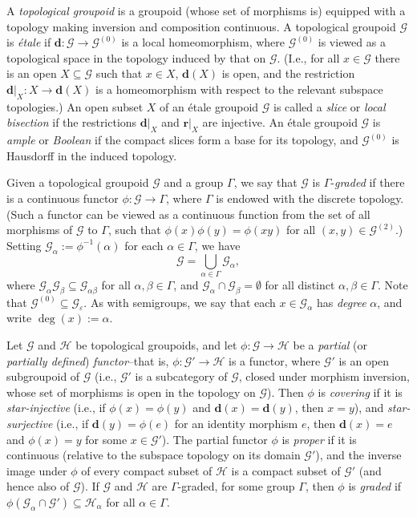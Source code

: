 \documentclass[a4paper,reqno,12pt]{amsart}
\numberwithin{equation}{section}
\theoremstyle{plain}
\theoremstyle{definition}
\newcommand{\ran}{\bm{r}}
\newcommand{\domr}{\bm{d}}
\newcommand{\G}{\Gamma}
\begin{document}
A \textit{topological groupoid} is a groupoid (whose set of morphisms is) equipped with a topology making inversion and composition continuous. A topological groupoid $\mathscr{G}$ is \textit{\'etale} if $\domr: \mathscr{G} \to \mathscr{G}^{(0)}$ is a local homeomorphism, where $\mathscr{G}^{(0)}$ is viewed as a topological space in the topology induced by that on $\mathscr{G}$. (I.e., for all $x \in \mathscr{G}$ there is an open $X \subseteq \mathscr{G}$ such that $x \in X$, $\domr(X)$ is open, and the restriction $\domr|_{X} : X \to \domr(X)$ is a homeomorphism with respect to the relevant subspace topologies.) An open subset $X$ of an \'etale groupoid $\mathscr{G}$ is called a \emph{slice} or \emph{local bisection} if the restrictions $\domr|_{X}$ and $\ran|_{X}$ are injective. An \'etale groupoid $\mathscr{G}$ is \emph{ample} or \emph{Boolean} if the compact slices form a base for its topology, and $\mathscr{G}^{(0)}$ is Hausdorff in the induced topology.

Given a topological groupoid $\mathscr{G}$ and a group $\Gamma$, we say that $\mathscr{G}$ is $\Gamma$-\emph{graded} if there is a continuous functor $\phi:\mathscr{G} \rightarrow \Gamma$, where $\Gamma$ is endowed with the discrete topology. (Such a functor can be viewed as a continuous function from the set of all morphisms of $\mathscr{G}$ to $\Gamma$, such that $\phi(x)\phi(y) = \phi(xy)$ for all $(x,y) \in \mathscr{G}^{(2)}$.) Setting $\mathscr{G}_\alpha:=\phi^{-1}(\alpha)$ for each $\alpha \in \Gamma$, we have
\[\mathscr{G}= \bigcup_{\alpha \in \G} \mathscr{G}_\alpha,\]
where $\mathscr{G}_\alpha \mathscr{G}_\beta \subseteq \mathscr{G}_{\alpha\beta}$ for all $\alpha,\beta \in \Gamma$, and $\mathscr{G}_\alpha \cap \mathscr{G}_\beta = \emptyset$ for all distinct $\alpha,\beta \in \Gamma$. Note that $\mathscr{G}^{(0)} \subseteq \mathscr{G}_\varepsilon$. As with semigroups, we say that each $x \in \mathscr{G}_\alpha$ has \emph{degree} $\alpha$, and write $\deg(x) := \alpha$.

Let $\mathscr{G}$ and $\mathscr{H}$ be topological groupoids, and let $\phi : \mathscr{G} \to \mathscr{H}$ be a \emph{partial} (or \emph{partially defined}) \emph{functor}--that is, $\phi : \mathscr{G}' \to \mathscr{H}$ is a functor, where $\mathscr{G}'$ is an open subgroupoid of $\mathscr{G}$ (i.e., $\mathscr{G}'$ is a subcategory of $\mathscr{G}$, closed under morphism inversion, whose set of morphisms is open in the topology on $\mathscr{G}$). Then $\phi$ is \emph{covering} if it is \emph{star-injective} (i.e., if $\phi(x) = \phi(y)$ and $\domr(x) = \domr(y)$, then $x = y$), and \emph{star-surjective} (i.e., if $\domr(y) = \phi(e)$ for an identity morphism $e$, then $\domr(x) = e$ and $\phi(x) = y$ for some $x \in \mathscr{G}'$). The partial functor $\phi$ is \emph{proper} if it is continuous (relative to the subspace topology on its domain $\mathscr{G}'$), and the inverse image under $\phi$ of every compact subset of $\mathscr{H}$ is a compact subset of $\mathscr{G}'$ (and hence also of $\mathscr{G}$). If $\mathscr{G}$ and $\mathscr{H}$ are $\Gamma$-graded, for some group $\Gamma$, then $\phi$ is \emph{graded} if $\phi(\mathscr{G}_{\alpha} \cap \mathscr{G}') \subseteq \mathscr{H}_{\alpha}$ for all $\alpha \in \Gamma$.
\end{document}
